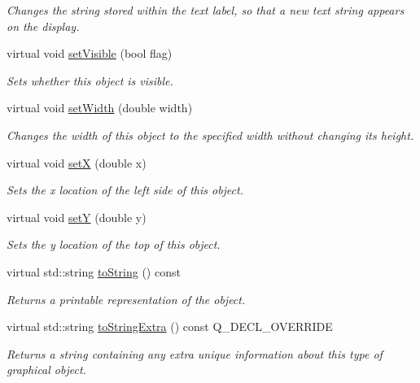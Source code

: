 \begin{DoxyCompactItemize}
\begin{DoxyCompactList}\small\item\em Changes the string stored within the text label, so that a new text string appears on the display. \end{DoxyCompactList}\item 
virtual void \mbox{\hyperlink{classGObject_a88203f28224315d9f4471212f4af8ed3}{set\+Visible}} (bool flag)
\begin{DoxyCompactList}\small\item\em Sets whether this object is visible. \end{DoxyCompactList}\item 
virtual void \mbox{\hyperlink{classGObject_aa3f3fba4cb131baa8696ba01e3bceca1}{set\+Width}} (double width)
\begin{DoxyCompactList}\small\item\em Changes the width of this object to the specified width without changing its height. \end{DoxyCompactList}\item 
virtual void \mbox{\hyperlink{classGObject_a9c18fcc579333bf9653d13ad2b372e39}{setX}} (double x)
\begin{DoxyCompactList}\small\item\em Sets the x location of the left side of this object. \end{DoxyCompactList}\item 
virtual void \mbox{\hyperlink{classGObject_a7d57e2a5c35d27feb58fd498a3cf82b9}{setY}} (double y)
\begin{DoxyCompactList}\small\item\em Sets the y location of the top of this object. \end{DoxyCompactList}\item 
virtual std\+::string \mbox{\hyperlink{classGObject_a1fe5121d6528fdea3f243321b3fa3a49}{to\+String}} () const
\begin{DoxyCompactList}\small\item\em Returns a printable representation of the object. \end{DoxyCompactList}\item 
virtual std\+::string \mbox{\hyperlink{classGText_a85b5bcebac42ec5f130b0c3851383a23}{to\+String\+Extra}} () const Q\+\_\+\+D\+E\+C\+L\+\_\+\+O\+V\+E\+R\+R\+I\+DE
\begin{DoxyCompactList}\small\item\em Returns a string containing any extra unique information about this type of graphical object. \end{DoxyCompactList}\end{DoxyCompactItemize}
